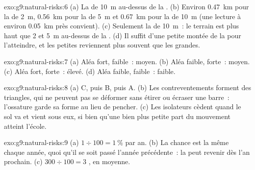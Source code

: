 \begin{solution}{exo:g9:natural-risks:6}
(a) La  de \qty{10}{m} au-dessus de la . (b) Environ
\qty{0.47}{km} pour la  de \qty{2}{m}, \qty{0.56}{km} pour la  de
\qty{5}{m} et \qty{0.67}{km} pour la  de \qty{10}{m} (une lecture à
environ \qty{0.05}{km} près convient). (c) Seulement la  de
\qty{10}{m}~: le terrain est plus haut que 2 et \qty{5}{m} au-dessus de
la . (d) Il suffit d'une petite montée de la  pour
l'atteindre, et les petites  reviennent plus souvent que les
grandes.
\end{solution}

\begin{solution}{exo:g9:natural-risks:7}
(a) Aléa fort,  faible~:  moyen. (b) Aléa faible,
 forte~:  moyen. (c) Aléa fort,  forte~:
 élevé. (d) Aléa faible,  faible~:  faible.
\end{solution}

\begin{solution}{exo:g9:natural-risks:8}
(a) C, puis B, puis A. (b) Les contreventements forment des triangles,
qui ne peuvent pas se déformer sans étirer ou écraser une barre~:
l'ossature garde sa forme au lieu de pencher. (c) Les isolateurs cèdent
quand le sol va et vient sous eux, si bien qu'une bien plus petite part
du mouvement atteint l'école.
\end{solution}

\begin{solution}{exo:g9:natural-risks:9}
(a) $1 \div 100 = 1~\%$ par an. (b) La chance est la même chaque année,
quoi qu'il se soit passé l'année précédente~: la  peut revenir dès
l'an prochain. (c) $300 \div 100 = 3$ , en moyenne.
\end{solution}

